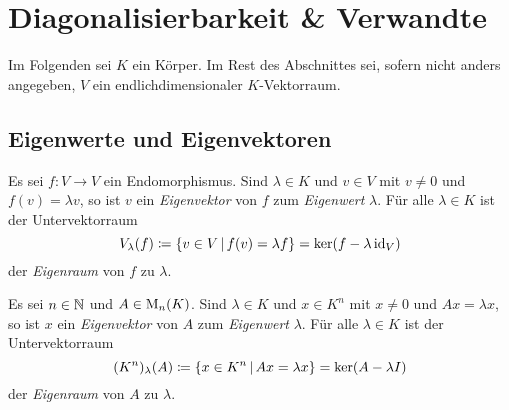 \chapter{Diagonalisierbarkeit \& Verwandte}

Im Folgenden sei $K$ ein Körper.
Im Rest des Abschnittes sei, sofern nicht anders angegeben, $V$ ein endlichdimensionaler $K$-Vektorraum.





\section{Eigenwerte und Eigenvektoren}

\begin{definition}
  Es sei $f \colon V \to V$ ein Endomorphismus.
  Sind $\lambda \in K$ und $v \in V$ mit $v \neq 0$ und $f(v) = \lambda v$, so ist $v$ ein \emph{Eigenvektor} von $f$ zum \emph{Eigenwert} $\lambda$.
  Für alle $\lambda \in K$ ist der Untervektorraum
  \[
              V_{\lambda}(f)
    \coloneqq \{ v \in V \,|\, f(v) = \lambda f \}
    =         \ker (f - \lambda \operatorname{id}_V)
  \]
  der \emph{Eigenraum} von $f$ zu $\lambda$.

  Es sei $n \in \mathbb{N}$ und $A \in \operatorname{M}_{n}(K)$.
  Sind $\lambda \in K$ und $x \in K^n$ mit $x \neq 0$ und $Ax = \lambda x$, so ist $x$ ein \emph{Eigenvektor} von $A$ zum \emph{Eigenwert} $\lambda$.
  Für alle $\lambda \in K$ ist der Untervektorraum
  \[
              (K^n)_{\lambda}(A)
    \coloneqq \{ x \in K^n \,|\, Ax = \lambda x \}
    =         \ker (A - \lambda I)
  \]
  der \emph{Eigenraum} von $A$ zu $\lambda$.
\end{definition}

